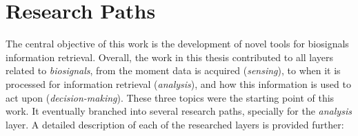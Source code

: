 
\section{Research Paths}

The central objective of this work is the development of novel tools for biosignals information retrieval. Overall, the work in this thesis contributed to all layers related to \textit{biosignals}, from the moment data is acquired (\textit{sensing}), to when it is processed for information retrieval (\textit{analysis}), and how this information is used to act upon (\textit{decision-making}). These three topics were the starting point of this work. It eventually branched into several research paths, specially for the \textit{analysis} layer.
A detailed description of each of the researched layers is provided further:

